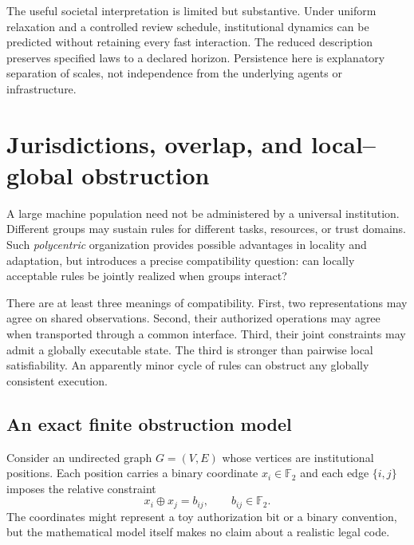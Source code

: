 The useful societal interpretation is limited but substantive. Under uniform relaxation and a controlled review schedule, institutional dynamics can be predicted without retaining every fast interaction. The reduced description preserves specified laws to a declared horizon. Persistence here is explanatory separation of scales, not independence from the underlying agents or infrastructure.


\section{Jurisdictions, overlap, and local--global obstruction}\label{MS:sec:jurisdictions}

A large machine population need not be administered by a universal institution. Different groups may sustain rules for different tasks, resources, or trust domains. Such \emph{polycentric} organization provides possible advantages in locality and adaptation, but introduces a precise compatibility question: can locally acceptable rules be jointly realized when groups interact?

There are at least three meanings of compatibility. First, two representations may agree on shared observations. Second, their authorized operations may agree when transported through a common interface. Third, their joint constraints may admit a globally executable state. The third is stronger than pairwise local satisfiability. An apparently minor cycle of rules can obstruct any globally consistent execution.

\subsection{An exact finite obstruction model}

Consider an undirected graph $G=(V,E)$ whose vertices are institutional positions. Each position carries a binary coordinate $x_i\in\mathbb F_2$ and each edge $\{i,j\}$ imposes the relative constraint
\begin{equation}\label{MS:eq:edge-rule}
x_i\oplus x_j=b_{ij},\qquad b_{ij}\in\mathbb F_2.
\end{equation}
The coordinates might represent a toy authorization bit or a binary convention, but the mathematical model itself makes no claim about a realistic legal code.

